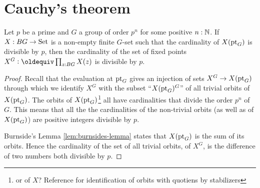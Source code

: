 \section{Cauchy's theorem}
\begin{lemma}
  \label{lem:fixedptsize}
  Let $p$ be a prime and $G$ a group of order $p^n$ for some positive $n:\mathbb{N}$.  If $X:BG\to\mathord{\mathrm{Set}}$ is a non-empty finite $G$-set such that the cardinality of $X({\mathord{\mathrm{pt}}}_G)$ is divisible by $p$, then the cardinality of the set of fixed points $X^G\defequi\prod_{z:BG}X(z)$ is divisible by $p$.
\end{lemma}
\begin{proof}
  Recall that the evaluation at ${\mathord{\mathrm{pt}}}_G$ gives an injection of sets $X^G\to X({\mathord{\mathrm{pt}}}_G)$ through which we identify $X^G$ with the subset ``$X({\mathord{\mathrm{pt}}}_G)^G$'' of all trivial orbits of $X({\mathord{\mathrm{pt}}}_G)$.
 The orbits of $X({\mathord{\mathrm{pt}}}_G)$\footnote{or of $X$?  Reference for identification of orbits with quotiens by stabilizers} all have cardinalities that divide the order $p^n$ of $G$.  
This means that all the the cardinalities of the non-trivial orbits (as well as of $X({\mathord{\mathrm{pt}}}_G)$) are positive integers divisible by $p$. 

 Burnside's Lemma \cref{lem:burnsides-lemma} states that $X({\mathord{\mathrm{pt}}}_G)$ is the sum of its orbits.
Hence the cardinality of the set of all trivial orbits, \ie of $X^G$, is the difference of two numbers both divisible by $p$.  
\end{proof}

